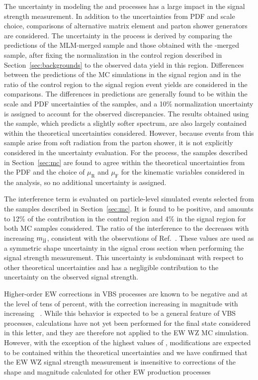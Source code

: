 The uncertainty in modeling the \EWWZ and \QCDWZ
processes has a large impact in the \EWWZ signal strength measurement.
In addition to the uncertainties from PDF and scale choice, 
comparisons of alternative matrix element and parton shower generators are
considered.
The uncertainty in the \QCDWZ process is derived by
comparing the predictions of the MLM-merged sample and those obtained with the \FxFx-merged sample,
after fixing the normalization in the control region described in Section~\ref{sec:backgrounds}
to the observed data yield in this region.
Differences between the predictions of the MC simulations
in the signal region and in the ratio
of the control region to the signal region event yields
are considered in the comparisons.
The differences in predictions are generally found to be
within the scale and PDF uncertainties of the samples,
and a 10\% normalization uncertainty is assigned to account for
the observed discrepancies.
The results obtained using the \POWHEG sample,
which predicts a slightly softer {\mjj} spectrum, are also largely contained 
within the theoretical uncertainties considered.
However, because \WZjj events from this sample arise from
soft radiation from the parton shower, it is 
not explicitly considered in the uncertainty evaluation.
For the \EWWZ process, the samples described in Section~\ref{sec:mc}
are found to agree within
the theoretical uncertainties from the PDF and the choice of 
$\mu_{\mathrm{R}}$ and $\mu_{\mathrm{F}}$ 
for the kinematic variables considered in the analysis,
so no additional uncertainty is
assigned. 

The interference term is evaluated on particle-level simulated events
selected from the samples described in Section~\ref{sec:mc}. 
It is found to be positive, and amounts to 12\% 
of the \EWWZ contribution in the control region and 4\% in the signal region
for both MC samples considered. 
The ratio of the interference to the \EWWZ 
decreases with increasing $m_{\mathrm{jj}}$, consistent with the observations of Ref.~\cite{leshouches2017}.
These values are used as a symmetric shape uncertainty in the 
signal cross section when performing the 
\EWWZ signal strength measurement.
This uncertainty is subdominant with respect to other theoretical uncertainties 
and has a negligible contribution to the uncertainty 
on the observed \EWWZ signal strength.

Higher-order EW corrections in VBS processes are known to be negative and at
the level of tens of percent, with the correction increasing in magnitude 
with increasing {\mjj}~\cite{Biedermann:2016yds}.
While this behavior is expected to be a general feature of VBS processes, 
calculations have not yet been performed for the final state considered 
in this letter, and they are therefore not applied to the EW WZ MC simulation. 
However, with the exception of the highest values of {\mjj}, modifications 
are expected to be contained within the theoretical uncertainties and 
we have confirmed that the EW WZ signal strength measurement is 
insensitive to corrections of the shape and magnitude calculated for 
other EW production processes

